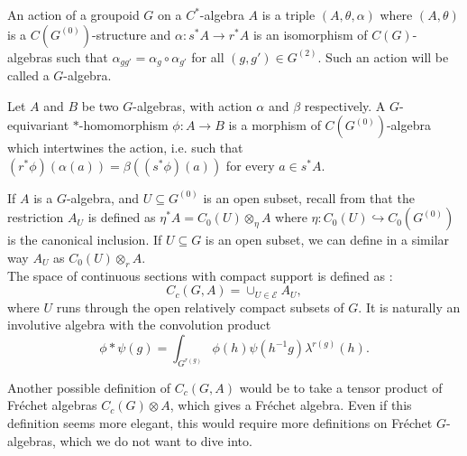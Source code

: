 \begin{definition}
An action of a groupoid $G$ on a $C^*$-algebra $A$ is a triple $(A,\theta,\alpha)$ where $(A,\theta)$ is a $C(G^{(0)})$-structure and $\alpha : s^* A \rightarrow r^* A$ is an isomorphism of $C(G)$-algebras such that $\alpha_{gg'}= \alpha_g\circ \alpha_{g'}$ for all $(g,g')\in G^{(2)}$. Such an action will be called a $G$-algebra. 
\end{definition} 

\begin{definition}
Let $A$ and $B$ be two $G$-algebras, with action $\alpha$ and $\beta$ respectively. A $G$-equivariant $*$-homomorphism $\phi :A \rightarrow B$ is a morphism of $C(G^{(0)})$-algebra which intertwines the action, i.e. such that $(r^*\phi)(\alpha(a) ) =\beta((s^*\phi)(a))$ for every $a\in s^* A$.
\end{definition} 

If $A$ is a $G$-algebra, and $U \subseteq G^{(0)}$ is an open subset, recall from \cite{LeGall} that the restriction $A_U$ is defined as $\eta^* A = C_0(U) \otimes_\eta A$ where $\eta : C_0(U) \hookrightarrow C_0(G^{(0)})$ is the canonical inclusion. If $U\subseteq G$ is an open subset, we can define in a similar way $A_U$ as $C_0(U) \otimes_r A$.\\

The space of continuous sections with compact support is defined as :
\[C_c(G,A) = \cup_{U\in \mathcal E} A_U,\]
where $U$ runs through the open relatively compact subsets of $G$. It is naturally an involutive algebra with the convolution product
\[\phi\ast \psi (g) = \int_{G^{r(g)}} \phi(h)\psi(h^{-1}g)\lambda^{r(g)}(h).\] 

\begin{rk}
Another possible definition of $C_c(G,A)$ would be to take a tensor product of Fréchet algebras $C_c(G)\otimes A$, which gives a Fréchet algebra. Even if this definition seems more elegant, this would require more definitions on Fréchet $G$-algebras, which we do not want to dive into.  
\end{rk}


